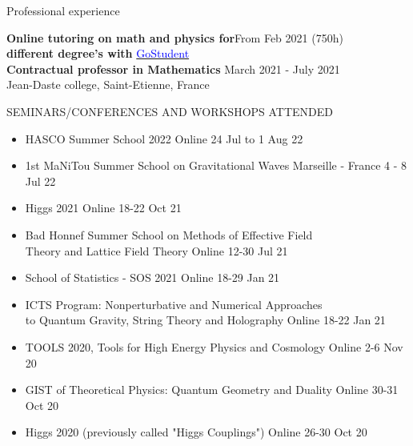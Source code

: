 \documentclass{resume} %
\begin{document}

\begin{rSection}{Professional experience}

{\bf Online tutoring on math and physics for}\hfill{From Feb 2021 (750h)}\\{\bf different degree's with} \href{https://www.gostudent.org/us}{\textcolor{blue}{GoStudent}} \\ 

{\bf Contractual professor in Mathematics} \hfill {March 2021 - July 2021} \\ 
Jean-Daste college, Saint-Etienne, France

\end{rSection}

\begin{rSection}{SEMINARS/CONFERENCES AND WORKSHOPS ATTENDED}

\begin{itemize}

\item HASCO Summer School 2022 \hfill Online 24 Jul to 1 Aug 22

\item 1st MaNiTou Summer School on Gravitational Waves \hfill Marseille - France 4 - 8 Jul 22 

\item Higgs 2021 \hfill Online 18-22 Oct 21

\item Bad Honnef Summer School on Methods of Effective Field\\Theory and Lattice Field Theory \hfill Online 12-30 Jul 21

\item School of Statistics - SOS 2021 \hfill Online 18-29 Jan 21

\item ICTS Program: Nonperturbative and Numerical Approaches\\to Quantum Gravity, String Theory and Holography \hfill Online 18-22 Jan 21

\item TOOLS 2020, Tools for High Energy Physics and Cosmology \hfill Online 2-6 Nov 20

\item GIST of Theoretical Physics: Quantum Geometry and Duality \hfill Online 30-31 Oct 20

\item Higgs 2020 (previously called "Higgs Couplings") \hfill Online 26-30 Oct 20


\end{itemize}
\end{rSection}
\end{document}
